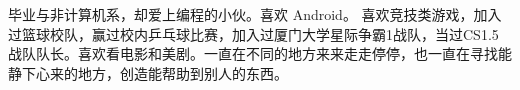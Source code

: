 
毕业与非计算机系，却爱上编程的小伙。喜欢 Android。 喜欢竞技类游戏，加入过篮球校队，赢过校内乒乓球比赛，加入过厦门大学星际争霸1战队，当过CS1.5战队队长。喜欢看电影和美剧。一直在不同的地方来来走走停停，也一直在寻找能静下心来的地方，创造能帮助到别人的东西。

